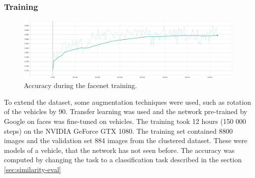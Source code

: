 \documentclass[a4paper,11pt,titlepage,twoside]{article}
\numberwithin{figure}{section}
\begin{document}
\subsubsection{Training}
\begin{figure}[h!]
\centering
\includegraphics[width=1\linewidth]{fig/facenet/acc.png}
\caption{Accuracy during the facenet training.}
\label{fig:facenet_training}
\end{figure}

To extend the dataset, some augmentation techniques were used, such as rotation of the vehicles by 90\textdegree. Transfer learning was used and the network pre-trained by Google on faces was fine-tuned on vehicles. The training took 12 hours (150 000 steps) on the NVIDIA GeForce GTX 1080. The training set contained 8800 images and the validation set 884 images from the clustered dataset. These were models of a vehicle, that the network has not seen before. The accuracy was computed by changing the task to a classification task described in the section \ref{sec:similarity-eval}
\end{document}
